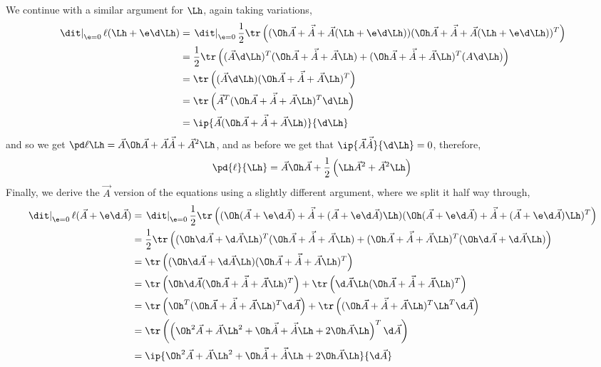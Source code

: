 \noindent
We continue with a similar argument for $\Lh$, again taking variations,
\begin{align*}
  \left.\dit\right|_{\e = 0} \ell (\Lh + \e\d\Lh) &= \left.\dit\right|_{\e = 0} \frac{1}{2}\tr \left( (\Oh \vec A + \vec {\dot A} + \vec A(\Lh + \e\d\Lh))(\Oh \vec A + \vec {\dot A} + \vec A(\Lh + \e\d\Lh))^T \right) \\
  &=\frac{1}{2}\tr \left( (\vec A\d \Lh)^T (\Oh\vec A + \vec{\dot A} + \vec A\Lh) + (\Oh\vec A + \vec{\dot A} + \vec A\Lh)^T (A\d\Lh) \right) \\
  &= \tr \left( (\vec A\d \Lh) (\Oh\vec A + \vec{\dot A} + \vec A\Lh)^T \right) \\
  &= \tr \left( \vec A^T (\Oh\vec A + \vec{\dot A} + \vec A\Lh)^T \d \Lh \right) \\
  &= \ip{\vec A (\Oh\vec A + \vec{\dot A} + \vec A\Lh)}{\d\Lh}
\end{align*}
and so we get $\displaystyle{\pd \ell \Lh = \vec A\Oh\vec A + \vec A\vec{\dot A} + \vec A^2\Lh}$, and as before we get that $\ip{\vec A\vec{\dot A}}{\d\Lh} = 0$, therefore,
\begin{align}
  \pd{\ell}{\Lh} = \vec A\Oh\vec A + \frac{1}{2}\left( \Lh \vec A^2 + \vec A^2\Lh \right)
\end{align}
Finally, we derive the $\vec A$ version of the equations using a slightly different argument, where we split it half way through,
\begin{align*}
  \left.\dit\right|_{\e = 0} \ell (\vec A + \e\d\vec A) &= \left.\dit\right|_{\e = 0} \frac{1}{2}\tr \left( (\Oh (\vec A + \e\d\vec A) + \vec {\dot A} + (\vec A + \e\d\vec A)\Lh)(\Oh (\vec A + \e\d\vec A) + \vec {\dot A} + (\vec A + \e\d\vec A)\Lh)^T \right) \\
  &= \frac{1}{2}\tr\left( (\Oh\d\vec A + \d\vec A\Lh)^T (\Oh\vec A + \vec{\dot A} + \vec A\Lh) + (\Oh\vec A + \vec{\dot A} + \vec A\Lh)^T(\Oh\d\vec A + \d\vec A\Lh) \right) \\
  &= \tr\left( (\Oh\d\vec A + \d\vec A\Lh) (\Oh\vec A + \vec{\dot A} + \vec A\Lh)^T \right) \\
  &= \tr\left( \Oh\d\vec A(\Oh\vec A + \vec{\dot A} + \vec A\Lh)^T \right) + \tr\left( \d\vec A\Lh (\Oh\vec A + \vec{\dot A} + \vec A\Lh)^T \right)\\
  &= \tr\left( \Oh^T(\Oh\vec A + \vec{\dot A} + \vec A\Lh)^T\d\vec A \right) + \tr\left(  (\Oh\vec A + \vec{\dot A} + \vec A\Lh)^T\Lh^T\d\vec A \right)\\
  &= \tr\left( \left(\Oh^2\vec A + \vec A\Lh^2 + \Oh\vec{\dot A} + \vec{\dot A}\Lh + 2\Oh\vec A\Lh \right)^T\d\vec A \right)\\
  &= \ip{\Oh^2\vec A + \vec A\Lh^2 + \Oh\vec{\dot A} + \vec{\dot A}\Lh + 2\Oh\vec A\Lh}{\d\vec A}
\end{align*}
